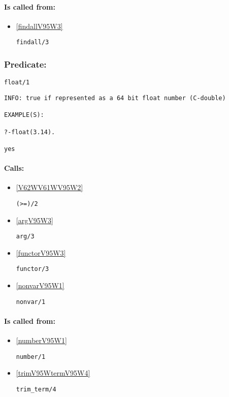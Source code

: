 \paragraph{Is called from:} 
\begin{itemize}
\item \ref{findallV95W3} 
\begin{verbatim}
findall/3
\end{verbatim}

\end{itemize}

\subsubsection{Predicate:} \label{floatV95W1}

\begin{verbatim}
float/1
\end{verbatim}

{\small \begin{verbatim}
INFO: true if represented as a 64 bit float number (C-double)

EXAMPLE(S):

?-float(3.14).

yes

\end{verbatim}}
\paragraph{Calls:} 
\begin{itemize}
\item \ref{V62WV61WV95W2} 
\begin{verbatim}
(>=)/2
\end{verbatim}

\item \ref{argV95W3} 
\begin{verbatim}
arg/3
\end{verbatim}

\item \ref{functorV95W3} 
\begin{verbatim}
functor/3
\end{verbatim}

\item \ref{nonvarV95W1} 
\begin{verbatim}
nonvar/1
\end{verbatim}

\end{itemize}
\paragraph{Is called from:} 
\begin{itemize}
\item \ref{numberV95W1} 
\begin{verbatim}
number/1
\end{verbatim}

\item \ref{trimV95WtermV95W4} 
\begin{verbatim}
trim_term/4
\end{verbatim}

\end{itemize}

